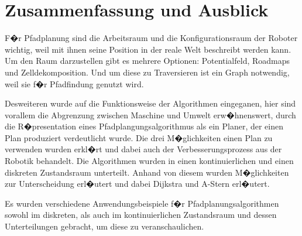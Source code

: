 \chapter{Zusammenfassung und Ausblick}

F�r Pfadplanung sind die Arbeitsraum und die Konfigurationsraum der Roboter wichtig, weil mit ihnen seine Position in der reale Welt beschreibt werden kann. Um den Raum darzustellen gibt es mehrere Optionen: Potentialfeld, Roadmaps und Zelldekomposition. Und um diese zu Traversieren ist ein Graph notwendig, weil sie f�r Pfadfindung genutzt wird.

Desweiteren wurde auf die Funktionsweise der Algorithmen eingeganen, hier sind vorallem die Abgrenzung zwischen Maschine und Umwelt erw�hnenswert, durch die R�presentation eines Pfadplangungsalgorithmus als ein Planer, der einen Plan produziert verdeutlicht wurde. Die drei M�glichkeiten einen Plan zu verwenden wurden erkl�rt und dabei auch der Verbesserungsprozess aus der Robotik behandelt. Die Algorithmen wurden in einen kontinuierlichen und einen diskreten Zustandsraum unterteilt. Anhand von diesem wurden M�glichkeiten zur Unterscheidung erl�utert und dabei Dijkstra und A-Stern erl�utert. 

Es wurden verschiedene Anwendungsbeispiele f�r Pfadplanungsalgorithmen sowohl im diskreten, als auch im kontinuierlichen Zustandsraum und dessen Unterteilungen gebracht, um diese zu veranschaulichen.
